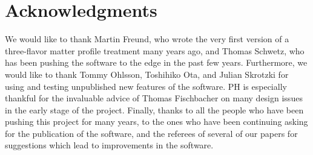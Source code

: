 \documentclass[a4paper,12pt,twoside]{book}
\newcommand{\AEDL}{{\sf AEDL}}
\begin{document}
%

\mainmatter







\chapter*{Acknowledgments}

We would like to thank Martin Freund, who wrote the very first
version of a three-flavor matter profile treatment many years ago,
and Thomas Schwetz, who has been pushing the software to the edge in the 
past few years. Furthermore, we would like to thank Tommy Ohlsson,
Toshihiko Ota, and Julian Skrotzki for using and testing unpublished new features of the software.
PH is especially thankful for the invaluable advice of Thomas Fischbacher on
many design issues in the early stage of the project.
Finally, thanks to all the people who have been pushing this project
for many years, to the ones who have been continuing asking for the
publication of the software, and the referees of several of our
papers for suggestions which lead to improvements in the software.
\end{document}
